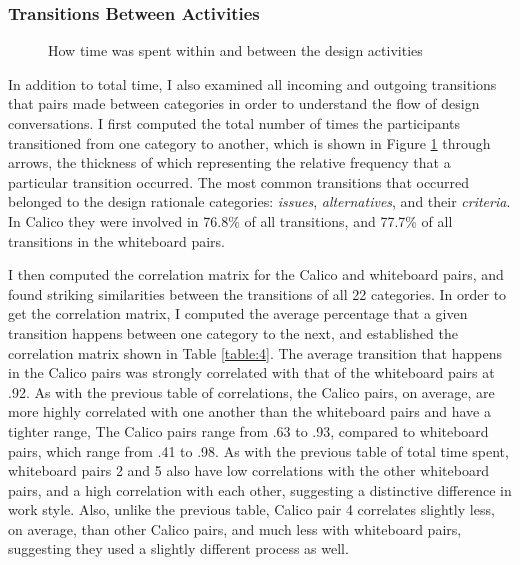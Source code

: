 \documentclass[12pt,fleqn]{ucithesis}
\begin{document}
\subsubsection {Transitions Between Activities}
\label{results:32}

\begin{figure}
\caption{How time was spent within and between the design activities}
\label{fig:13}      
\end{figure}
%

In addition to total time, I also examined all incoming and outgoing transitions that pairs made between categories in order to understand the flow of design conversations. I first computed the total number of times the participants transitioned from one category to another, which is shown in Figure \ref{fig:13} through arrows, the thickness of which representing the relative frequency that a particular transition occurred. The most common transitions that occurred belonged to the design rationale categories: \emph{issues}, \emph{alternatives}, and their \emph{criteria}. In Calico they were involved in 76.8\% of all transitions, and 77.7\% of all transitions in the whiteboard pairs. 

I then computed the correlation matrix for the Calico and whiteboard pairs, and found striking similarities between the transitions of all 22 categories. In order to get the correlation matrix, I computed the average percentage that a given transition happens between one category to the next, and established the correlation matrix shown in Table \ref{table:4}. The average transition that happens in the Calico pairs was strongly correlated with that of the whiteboard pairs at .92. As with the previous table of correlations, the Calico pairs, on average, are more highly correlated with one another than the whiteboard pairs and have a tighter range, The Calico pairs range from .63 to .93, compared to whiteboard pairs, which range from .41 to .98. As with the previous table of total time spent, whiteboard pairs 2 and 5 also have low correlations with the other whiteboard pairs, and a high correlation with each other, suggesting a distinctive difference in work style. Also, unlike the previous table, Calico pair 4 correlates slightly less, on average, than other Calico pairs, and much less with whiteboard pairs, suggesting they used a slightly different process as well.
\end{document}
